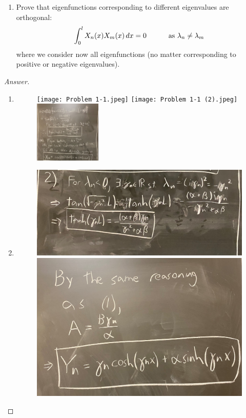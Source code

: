 \documentclass{article}
\theoremstyle{definition}
\renewcommand\qedsymbol{$\blacksquare$}
\newenvironment{ans}{\begin{proof}[Answer]\renewcommand{\qedsymbol}{}}{\end{proof}}
\newenvironment{boldenv}{\bfseries\boldmath}{}
\begin{document}
\begin{boldenv}
\begin{enumerate}
        \item Prove that eigenfunctions corresponding to different eigenvalues are orthogonal:
        \[ \int_0^l X_n(x)X_m(x)\,dx = 0 \mkern 50mu \text{ as } \lambda_n \neq \lambda_m \]
        where we consider now all eigenfunctions (no matter corresponding to positive or negative eigenvalues).

    \end{enumerate}
\end{boldenv}
\begin{ans}
    \begin{enumerate}
        \item \phantom{.}
        \begin{figure}[H]
            \centering
            \texttt{[image: Problem 1-1.jpeg]}
            \texttt{[image: Problem 1-1 (2).jpeg]}
            \includegraphics[width=0.3\textwidth]{Problem 1-1 (3).jpeg}
        \end{figure}

        \item \phantom{.}
        \begin{figure}[H]
            \centering
            \includegraphics[height=1.5 in]{Problem 1-2.jpeg}
            \includegraphics[height = 1.5 in]{Problem 1-2 (2).jpeg}
        \end{figure}


\end{enumerate}
\end{ans}
\end{document}
